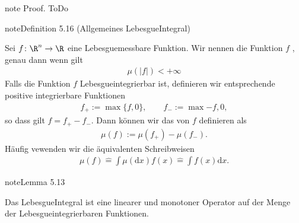 \documentclass[letterpaper,10pt,english]{jupyterBook}
\begin{document}
\begin{sphinxadmonition}{note}
\sphinxAtStartPar
Proof. ToDo
\end{sphinxadmonition}
\label{masstheorie/lebesgue_integral:definition-7}
\begin{sphinxadmonition}{note}{Definition 5.16 (Allgemeines Lebesgue\sphinxhyphen{}Integral)}



\sphinxAtStartPar
Sei \(f \colon \R^n \rightarrow \R\) eine Lebesgue\sphinxhyphen{}messbare Funktion.
Wir nennen die Funktion \(f\) , genau dann wenn gilt
\begin{equation*}
\begin{split}\mu(|f|) < +\infty\end{split}
\end{equation*}
\sphinxAtStartPar
Falls die Funktion \(f\) Lebesgue\sphinxhyphen{}integrierbar ist, definieren wir entsprechende positive integrierbare Funktionen
\begin{equation*}
\begin{split}f_+ := \max \lbrace f, 0 \rbrace, \qquad f_- := \max{-f, 0},\end{split}
\end{equation*}
\sphinxAtStartPar
so dass gilt \(f = f_+ - f_-\).
Dann können wir das  von \(f\) definieren als
\begin{equation*}
\begin{split}\mu(f) := \mu(f_+) - \mu(f_-).\end{split}
\end{equation*}
\sphinxAtStartPar
Häufig vewenden wir die äquivalenten Schreibweisen
\begin{equation*}
\begin{split}\mu(f) \hat{=} \int \mu(\mathrm{d}x) f(x) \hat{=} \int f(x) \mathrm{d}x.\end{split}
\end{equation*}\end{sphinxadmonition}
\label{masstheorie/lebesgue_integral:lemma-8}
\begin{sphinxadmonition}{note}{Lemma 5.13}



\sphinxAtStartPar
Das Lebesgue\sphinxhyphen{}Integral ist eine linearer und monotoner Operator auf der Menge der Lebesgue\sphinxhyphen{}integrierbaren Funktionen.
\end{sphinxadmonition}
\end{document}
